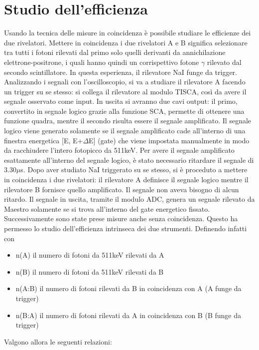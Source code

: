 \documentclass[italian,11pt]{report}
\begin{document}
\chapter{Studio dell'efficienza}

Usando la tecnica delle misure in coincidenza è possibile studiare le efficienze dei due rivelatori. Mettere in coincidenza i due rivelatori A e B significa selezionare tra tutti i fotoni rilevati dal primo solo quelli derivanti da annichilazione elettrone-positrone, i quali hanno quindi un corrispettivo fotone $\gamma$ rilevato dal secondo scintillatore. In questa esperienza, il rilevatore NaI funge da trigger. Analizzando i segnali con l'oscilloscopio, si va a studiare il rilevatore A facendo un trigger su se stesso: si collega il rilevatore al modulo TISCA, così da avere il segnale osservato come input. In uscita si avranno due cavi output: il primo, convertito in segnale logico grazie alla funzione SCA, permette di ottenere una funzione quadra, mentre il secondo risulta essere il segnale amplificato. Il segnale logico viene generato solamente se il segnale amplificato cade all'interno di una finestra energetica [E, E+$\Delta$E] (gate) che viene impostata manualmente in modo da racchiudere l'intero fotopicco da 511keV. Per avere il segnale amplificato esattamente all'interno del segnale logico, è stato necessario ritardare il segnale di 3.30$\mu$s. Dopo aver studiato NaI triggerato su se stesso, si è proceduto a mettere in coincidenza i due rivelatori: il rilevatore A definisce il segnale logico mentre il rilevatore B fornisce quello amplificato. Il segnale non aveva bisogno di alcun ritardo. Il segnale in uscita, tramite il modulo ADC, genera un segnale rilevato da Maestro solamente se si trova all'interno del gate energetico fissato. Successivamente sono state prese misure anche senza coincidenza. Questo ha permesso lo studio dell'efficienza intrinseca dei due strumenti. Definendo infatti con 

\begin{itemize}
    \item n(A) il numero di fotoni da 511keV rilevati da A
    \item n(B) il numero di fotoni da 511keV rilevati da B
    \item n(A:B) il numero di fotoni rilevati da B in coincidenza con A (A funge da trigger)
    \item n(B:A) il numero di fotoni rilevati da A in coincidenza con B (B funge da trigger)
\end{itemize}
Valgono allora le seguenti relazioni:
\end{document}

